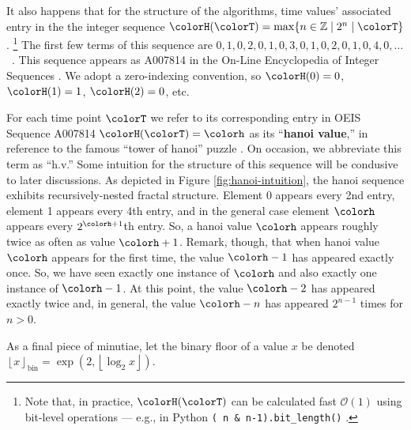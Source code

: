

It also happens that for the structure of the algorithms, time values' associated entry in the the integer sequence $\colorH(\colorT) = \max \{ n \in \mathbb{Z} \mid 2^n \mid \colorT \}$.%
\footnote{%
Note that, in practice, $\colorH(\colorT)$ can be calculated fast $\mathcal{O}(1)$ using bit-level operations --- e.g., in Python \texttt{(~n \& n-1).bit\_length()} \citep{oeis}.
}
The first few terms of this sequence are $0,\allowbreak 1,\allowbreak 0,\allowbreak 2,\allowbreak 0,\allowbreak 1,\allowbreak 0,\allowbreak 3,\allowbreak 0,\allowbreak 1,\allowbreak 0,\allowbreak 2,\allowbreak 0,\allowbreak 1,\allowbreak 0,\allowbreak 4,\allowbreak 0,\allowbreak \ldots$ \, .
This sequence appears as A007814 in the On-Line Encyclopedia of Integer Sequences \citep{oeis}.
We adopt a zero-indexing convention, so $\colorH(0) = 0$, $\colorH(1) = 1$, $\colorH(2) = 0$, etc.

For each time point $\colorT$ we refer to its corresponding entry in OEIS Sequence A007814 $\colorH(\colorT) = \colorh$ as its ``\textbf{hanoi value},'' in reference to the famous ``tower of hanoi'' puzzle \citep{lucas1889jeux}.
On occasion, we abbreviate this term as ``h.v.''
Some intuition for the structure of this sequence will be condusive to later discussions.
As depicted in Figure \ref{fig:hanoi-intuition}, the hanoi sequence exhibits recursively-nested fractal structure.
Element 0 appears every 2nd entry, element 1 appears every 4th entry, and in the general case element $\colorh$ appears every $2^{\colorh+1}$th entry.
So, a hanoi value $\colorh$ appears roughly twice as often as value $\colorh + 1$.
Remark, though, that when hanoi value $\colorh$ appears for the first time, the value $\colorh - 1$ has appeared exactly once.
So, we have seen exactly one instance of $\colorh$ and also exactly one instance of $\colorh - 1$.
At this point, the value $\colorh - 2$ has appeared exactly twice and, in general, the value $\colorh - n$ has appeared $2^{n - 1}$ times for $n > 0$.

As a final piece of minutiae, let the binary floor of a value $x$ be denoted $\left\lfloor x \right\rfloor_\mathrm{bin} = \exp(2, \left\lfloor \log_2 x \right\rfloor)$.
